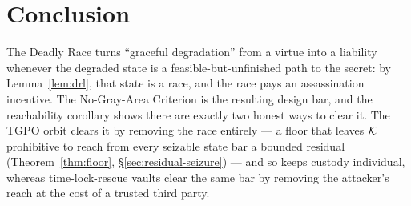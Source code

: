 \section{Conclusion}

The Deadly Race turns ``graceful degradation'' from a virtue into a liability
whenever the degraded state is a feasible-but-unfinished path to the secret: by
Lemma~\ref{lem:drl}, that state is a race, and the race pays an assassination
incentive. The No-Gray-Area Criterion is the resulting design bar, and the
reachability corollary shows there are exactly two honest ways to clear it. The
TGPO orbit clears it by removing the race entirely --- a floor that leaves $\mathcal{K}$
prohibitive to reach from every seizable state bar a bounded residual
(Theorem~\ref{thm:floor}, \S\ref{sec:residual-seizure}) --- and so keeps custody
individual, whereas time-lock-rescue vaults clear the same bar by removing the
attacker's reach at the cost of a trusted third party.

